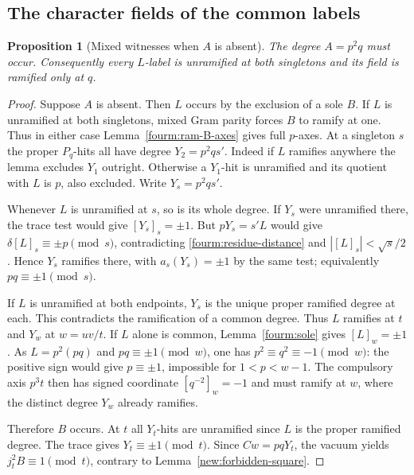 \documentclass[11pt,a4paper]{article}
\numberwithin{equation}{section}
\newtheorem{proposition}[theorem]{Proposition}
\theoremstyle{remark}
\begin{document}
\subsection{The character fields of the common labels}\label{fam:M:sec:12.2}
\begin{proposition}[Mixed witnesses when $A$ is absent]\label{fam:M:12.8}\label{nov:no-L-ram}
The degree $A=p^2q$ must occur. Consequently every $L$-label is
unramified at both singletons and its field is ramified only at $q$.
\end{proposition}
\begin{proof}
Suppose $A$ is absent. Then $L$ occurs by the exclusion of a sole $B$.
If $L$ is unramified at both singletons, mixed Gram parity forces
$B$ to ramify at one. Thus in either case
Lemma~\ref{fourm:ram-B-axes} gives full $p$-axes. At a singleton
$s$ the proper $P_q$-hits all have degree $Y_2=p^2qs'$.
Indeed if $L$ ramifies anywhere the lemma excludes $Y_1$ outright.
Otherwise a $Y_1$-hit is unramified and its quotient with $L$ is $p$,
also excluded. Write $Y_s=p^2qs'$.

Whenever $L$ is unramified at $s$, so is its whole degree.
If $Y_s$ were unramified there, the trace test would give
$[Y_s]_s=\pm1$. But $pY_s=s'L$ would give
$\delta[L]_s\equiv\pm p\pmod s$, contradicting
\eqref{fourm:residue-distance} and $|[L]_s|<\sqrt s/2$.
Hence $Y_s$ ramifies there, with $a_s(Y_s)=\pm1$ by the same
test; equivalently $pq\equiv\pm1\pmod s$.

If $L$ is unramified at both endpoints, $Y_s$ is the unique
proper ramified degree at each. This contradicts the ramification of
a common degree. Thus $L$ ramifies at $t$ and $Y_w$ at $w=uv/t$.
If $L$ alone is common, Lemma~\ref{fourm:sole} gives $[L]_w=\pm1$.
As $L=p^2(pq)$ and $pq\equiv\pm1\pmod w$, one has
$p^2\equiv q^2\equiv-1\pmod w$: the positive sign would give
$p\equiv\pm1$, impossible for $1<p<w-1$. The compulsory axis $p^3t$
then has signed coordinate $[q^{-2}]_w=-1$ and must ramify at $w$,
where the distinct degree $Y_w$ already ramifies.

Therefore $B$ occurs. At $t$ all $Y_t$-hits are unramified since
$L$ is the proper ramified degree. The trace gives $Y_t\equiv\pm1\pmod t$.
Since $Cw=pqY_t$, the vacuum yields $j_t^2B\equiv1\pmod t$,
contrary to Lemma~\ref{new:forbidden-square}.
\end{proof}
\end{document}
